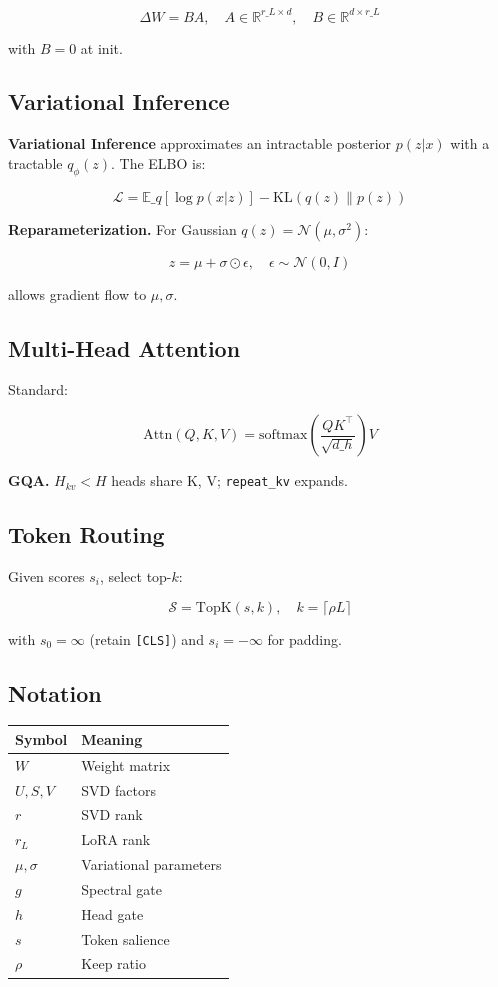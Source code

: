 \[
\Delta W = B A, \quad A \in \mathbb{R}^{r\_L \times d}, \quad B \in \mathbb{R}^{d \times r\_L}
\tag{3.3}
\]

with $B = 0$ at init.

\subsection{Variational Inference}

\textbf{Variational Inference} approximates an intractable posterior $p(z | x)$ 
with a tractable $q_\phi(z)$. The ELBO is:

\[
\mathcal{L} = \mathbb{E}\_{q}[\log p(x | z)] - \text{KL}(q(z) \| p(z))
\tag{3.4}
\]

\textbf{Reparameterization.} For Gaussian $q(z) = \mathcal{N}(\mu, \sigma^2)$:

\[
z = \mu + \sigma \odot \epsilon, \quad \epsilon \sim \mathcal{N}(0, I)
\tag{3.5}
\]

allows gradient flow to $\mu, \sigma$.

\subsection{Multi-Head Attention}

Standard:

\[
\text{Attn}(Q, K, V) = \text{softmax}\!\left(\frac{QK^\top}{\sqrt{d\_h}}\right) V
\tag{3.6}
\]

\textbf{GQA.} $H_{kv} < H$ heads share K, V; \texttt{repeat\_kv} expands.

\subsection{Token Routing}

Given scores $s_i$, select top-$k$:

\[
\mathcal{S} = \text{TopK}(s, k), \quad k = \lceil \rho L \rceil
\tag{3.7}
\]

with $s_0 = \infty$ (retain \texttt{[CLS]}) and $s_i = -\infty$ for padding.

\subsection{Notation}

\begin{table}[H]
\centering
\small
\begin{tabular}{ll}
\toprule
\textbf{Symbol} & \textbf{Meaning} \\
\midrule
$W$ & Weight matrix \\
$U, S, V$ & SVD factors \\
$r$ & SVD rank \\
$r_L$ & LoRA rank \\
$\mu, \sigma$ & Variational parameters \\
$g$ & Spectral gate \\
$h$ & Head gate \\
$s$ & Token salience \\
$\rho$ & Keep ratio \\
\bottomrule
\end{tabular}
\end{table}



